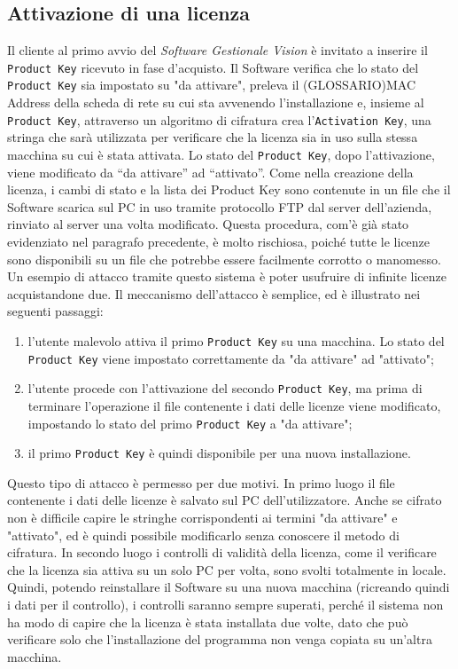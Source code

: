 \subsection{Attivazione di una licenza} 
Il cliente al primo avvio del \textit{Software Gestionale Vision} è invitato a inserire il \texttt{Product Key} ricevuto in fase d'acquisto. Il Software verifica che lo stato del \texttt{Product Key} sia impostato su "da attivare", preleva il (GLOSSARIO)MAC Address della scheda di rete su cui sta avvenendo l'installazione e, insieme al \texttt{Product Key}, attraverso un algoritmo di cifratura crea l’\texttt{Activation Key}, una stringa che sarà utilizzata per verificare che la licenza sia in uso sulla stessa macchina su cui è stata attivata. Lo stato del \texttt{Product Key}, dopo l'attivazione, viene modificato da “da attivare” ad “attivato”. Come nella creazione della licenza, i cambi di stato e la lista dei Product Key sono contenute in un file che il Software scarica sul PC in uso tramite protocollo FTP dal server dell’azienda, rinviato al server una volta modificato. Questa procedura, com'è già stato evidenziato nel paragrafo precedente, è molto rischiosa, poiché tutte le licenze sono disponibili su un file che potrebbe essere facilmente corrotto o manomesso.\\
Un esempio di attacco tramite questo sistema è poter usufruire di infinite licenze acquistandone due. 
Il meccanismo dell'attacco è semplice, ed è illustrato nei seguenti passaggi:
\begin{enumerate}
\item l'utente malevolo attiva il primo \texttt{Product Key} su una macchina. Lo stato del \texttt{Product Key} viene impostato correttamente da "da attivare" ad "attivato"; 
\item l'utente procede con l'attivazione del secondo \texttt{Product Key}, ma prima di terminare l'operazione il file contenente i dati delle licenze viene modificato, impostando lo stato del primo \texttt{Product Key} a "da attivare";
\item il primo \texttt{Product Key} è quindi disponibile per una nuova installazione.
\end{enumerate}
Questo tipo di attacco è permesso per due motivi. In primo luogo il file contenente i dati delle licenze è salvato sul PC dell'utilizzatore. Anche se cifrato non è difficile capire le stringhe corrispondenti ai termini "da attivare" e "attivato", ed è quindi possibile modificarlo senza conoscere il metodo di cifratura. In secondo luogo i controlli di validità della licenza, come il verificare che la licenza sia attiva su un solo PC per volta, sono svolti totalmente in locale. Quindi, potendo reinstallare il Software su una nuova macchina (ricreando quindi i dati per il controllo), i controlli saranno sempre superati, perché il sistema non ha modo di capire che la licenza è stata installata due volte, dato che può verificare solo che l'installazione del programma non venga copiata su un'altra macchina. 

